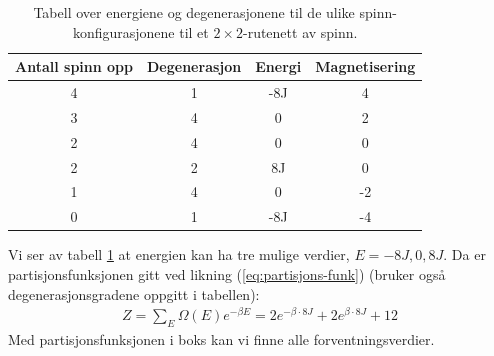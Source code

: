 \documentclass[11pt]{article}
\begin{document}
\begin{table}[ht]
\centering
\caption{Tabell over energiene og degenerasjonene til de ulike
  spinn-konfigurasjonene til et $2\times 2$-rutenett av spinn.}
\label{tab:spinn-energi-deg}
\vspace{0.5cm}
\begin{tabular}{cccc}
Antall spinn opp & Degenerasjon & Energi & Magnetisering \\
\hline
4 & 1 & -8J & 4 \\
3 & 4 & 0 & 2 \\
2 & 4 & 0 & 0 \\
2 & 2 & 8J & 0 \\
1 & 4 & 0 & -2 \\
0 & 1 & -8J & -4 \\
\hline
\end{tabular}
\end{table}

Vi ser av tabell \ref{tab:spinn-energi-deg} at energien kan ha tre
mulige verdier, $E = -8J,0,8J$. Da er partisjonsfunksjonen gitt ved
likning (\ref{eq:partisjons-funk}) (bruker også degenerasjonsgradene
oppgitt i tabellen):
\begin{align}
  Z = \sum_E \Omega(E)e^{-\beta E} = 2e^{-\beta \cdot 8J} + 2e^{\beta
  \cdot 8J} + 12\label{eq:partisjons-funk-2x2}
\end{align}
Med partisjonsfunksjonen i boks kan vi finne alle forventningsverdier.
\end{document}
